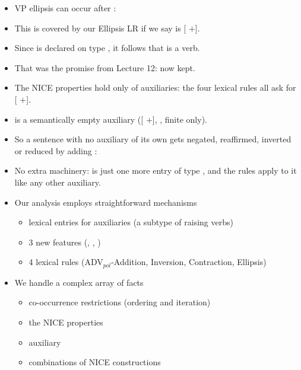 \documentclass[a4paper,landscape,headrule,footrule]{foils}
\begin{document}
\begin{itemize}
\item VP ellipsis can occur after :
  \begin{exe}
  \ex {}
  \end{exe}
\item This is covered by our Ellipsis LR if we say  is
  [ $+$].
\item Since  is declared on type , it follows that
   is a verb.
\item That was the promise from Lecture 12: now kept.
\end{itemize}

\begin{itemize}
\item The NICE properties hold only of auxiliaries: the four lexical
  rules all ask for [ $+$].
\item {} is a semantically empty auxiliary ([ $+$],
   \el, finite only).
\item So a sentence with no auxiliary of its own gets negated,
  reaffirmed, inverted or reduced by adding :
  \begin{exe}
  \ex {} \quad {} \quad {}
  \ex {} \quad {}
  \end{exe}
\item No extra machinery:  is just one more entry of type
  , and the rules apply to it like any other auxiliary.
\end{itemize}

\begin{itemize}
\item Our analysis employs straightforward mechanisms
  \begin{itemize}
  \item lexical entries for auxiliaries (a subtype of raising verbs)
  \item 3 new features (, , )
  \item 4 lexical rules (ADV$_{pol}$-Addition, Inversion, Contraction,
    Ellipsis)
  \end{itemize}
\item We handle a complex array of facts
  \begin{itemize}
  \item co-occurrence restrictions (ordering and iteration)
  \item the NICE properties
  \item auxiliary 
  \item combinations of NICE constructions
  \end{itemize}
\end{itemize}
\end{document}
